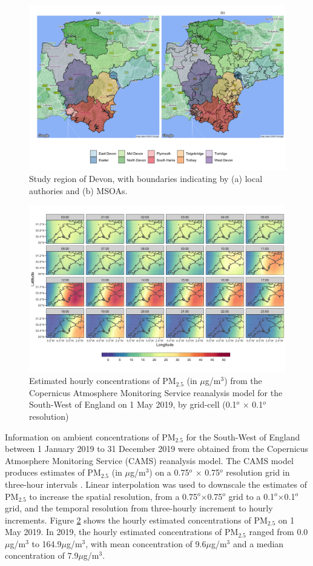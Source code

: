 \documentclass{article}
\begin{document}
\begin{figure}[!hbtp]
	\centering
	\includegraphics[width=0.9\linewidth]{Figures/Devon_GGMAP}		
	\caption{Study region of Devon, with boundaries indicating by (a) local authories and (b) MSOAs. } \label{fig::studyregiondvn}
\end{figure}
\begin{figure}[!hbtp]
	\centering
	\includegraphics[width = 0.9\linewidth]{Figures/PM25_20190501}
	\caption{Estimated hourly concentrations of PM$_{2.5}$ (in $\mu$g/m$^3$) from the Copernicus Atmosphere Monitoring Service reanalysis model for the South-West of England on 1 May 2019, by grid-cell (0.1$^{o}$ $\times$ 0.1$^{o}$ resolution)}
	\label{fig::PMConc}
\end{figure}

\noindent Information on ambient concentrations of PM$_{2.5}$ for the South-West of England between 1 January 2019 to 31 December 2019 were obtained from the Copernicus Atmosphere Monitoring Service (CAMS) reanalysis model. The CAMS model produces estimates of PM$_{2.5}$ (in $\mu$g/m$^3$) on a 0.75$^{o}$ $\times$ 0.75$^{o}$ resolution grid in three-hour intervals \citep{CAMS}. Linear interpolation was used to downscale the estimates of PM$_{2.5}$ to increase the spatial resolution, from a 0.75$^{o}$$\times$0.75$^{o}$ grid to a 0.1$^{o}$$\times$0.1$^{o}$ grid, and  the temporal resolution  from three-hourly increment to hourly increments. Figure \ref{fig::PMConc} shows the hourly estimated concentrations of PM$_{2.5}$ on 1 May 2019. In 2019, the hourly estimated concentrations of PM$_{2.5}$ ranged from 0.0$\mu$g/m$^3$ to 164.9$\mu$g/m$^3$, with mean concentration of 9.6$\mu$g/m$^3$ and a median concentration of 7.9$\mu$g/m$^3$. \\
\end{document}
